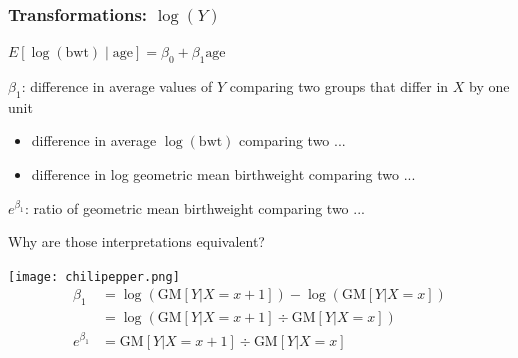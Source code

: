 \documentclass[10pt,t]{beamer}
\begin{document}
\begin{frame}
\frametitle{Transformations: $\log(Y)$}
\begin{center} $E[\log(\text{bwt})\mid \text{age}] = \beta_0 + \beta_1 \text{age}$ \end{center}
$\beta_1$: difference in average values of $Y$ comparing two groups that differ in $X$ by one unit\\ \pause
\begin{itemize}
	\item[] difference in average $\log(\text{bwt})$ comparing two ...\pause
	\item[] difference in log geometric mean birthweight comparing two ... \pause
\end{itemize}
\color{blue} $e^{\beta_1}$: ratio of geometric mean birthweight comparing two ... \color{black} \pause
\vspace{0.3cm}

Why are those interpretations equivalent?

\texttt{[image: chilipepper.png]}
\begin{align*}
\beta_1 & = \log(\text{GM}[Y|X=x+1])-\log(\text{GM}[Y|X=x])\\
& = \log\left(\text{GM}[Y|X=x+1]\div\text{GM}[Y|X=x]\right)\\
e^{\beta_1} & = \text{GM}[Y|X=x+1]\div\text{GM}[Y|X=x]
\end{align*}
\end{frame}
\end{document}
